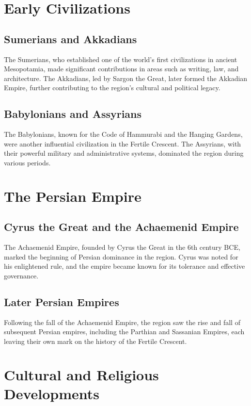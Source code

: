 \documentclass[a4paper,12pt]{book}
\begin{document}
\section{Early Civilizations}
\label{sec:early-civilizations}

\subsection{Sumerians and Akkadians}
The Sumerians, who established one of the world’s first civilizations in ancient Mesopotamia, made significant contributions in areas such as writing, law, and architecture. The Akkadians, led by Sargon the Great, later formed the Akkadian Empire, further contributing to the region's cultural and political legacy.

\subsection{Babylonians and Assyrians}
The Babylonians, known for the Code of Hammurabi and the Hanging Gardens, were another influential civilization in the Fertile Crescent. The Assyrians, with their powerful military and administrative systems, dominated the region during various periods.

\section{The Persian Empire}
\label{sec:persian-empire}

\subsection{Cyrus the Great and the Achaemenid Empire}
The Achaemenid Empire, founded by Cyrus the Great in the 6th century BCE, marked the beginning of Persian dominance in the region. Cyrus was noted for his enlightened rule, and the empire became known for its tolerance and effective governance.

\subsection{Later Persian Empires}
Following the fall of the Achaemenid Empire, the region saw the rise and fall of subsequent Persian empires, including the Parthian and Sassanian Empires, each leaving their own mark on the history of the Fertile Crescent.

\section{Cultural and Religious Developments}
\label{sec:cultural-religious-developments}
\end{document}
